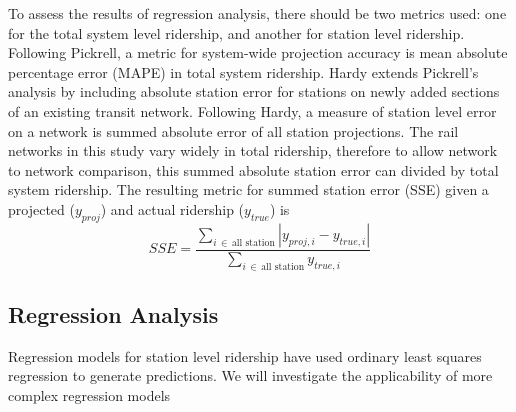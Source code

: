 \documentclass{article}
\begin{document}
To assess the results of regression analysis, there should be two metrics used: one for the total system level ridership, and another for station level ridership. Following Pickrell, a metric for system-wide projection accuracy is mean absolute percentage error (MAPE) in total system ridership. Hardy \cite{Hardy2010} extends Pickrell's analysis by including absolute station error for stations on newly added sections of an existing transit network. Following Hardy, a measure of station level error on a network is summed absolute error of all station projections. The rail networks in this study vary widely in total ridership, therefore to allow network to network comparison, this summed absolute station error can divided by total system ridership. The resulting metric for summed station error (SSE) given a projected ($y_{proj}$) and actual ridership ($y_{true}$) is 
$$SSE = \dfrac{\sum\limits_{i\,\in\,\text{all station}}\left|y_{proj, i} - y_{true, i}\right|}{\sum\limits_{i\,\in\,\text{all station}} y_{true, i}}$$



\subsection{Regression Analysis}

Regression models for station level ridership have used ordinary least squares regression \cite{Kuby2004, Taylor2008, Currie2011, Durning2015, Gutierrez2011} to generate predictions. We will investigate the applicability of more complex regression models 






 

\pagebreak
\end{document}
